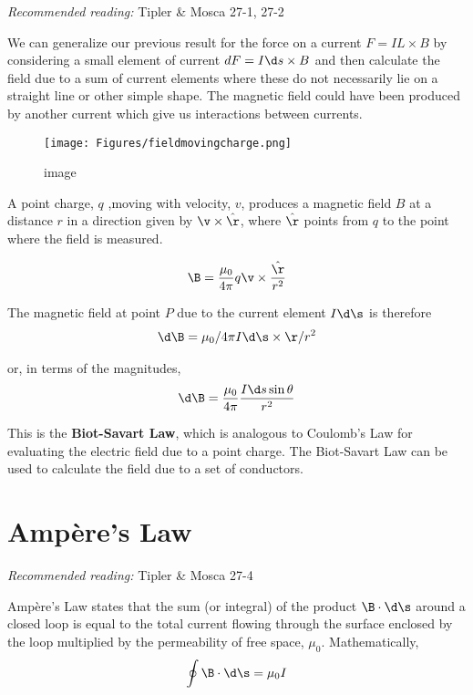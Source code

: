 \documentclass[
]{book}
\theoremstyle{definition}
\theoremstyle{definition}
\theoremstyle{definition}
\theoremstyle{definition}
\theoremstyle{remark}
\begin{document}
\emph{Recommended reading:} Tipler \& Mosca 27-1, 27-2

We can generalize our previous result for the force on a current
\(F = IL \times B\) by considering a small element of current
\(dF = I \d s \times B\) and then calculate the field due to a sum of
current elements where these do not necessarily lie on a straight line
or other simple shape. The magnetic field could have been produced by
another current which give us interactions between currents.

\begin{figure}
\centering
\texttt{[image: Figures/fieldmovingcharge.png]}
\caption{image}
\end{figure}

A point charge, \(q\) ,moving with velocity, \(v\), produces a magnetic
field \(B\) at a distance \(r\) in a direction given by
\(\v \times \hat{\r}\), where \(\hat{\r}\) points from \(q\) to the point
where the field is measured.

\[\begin{aligned}
\B = \frac{\mu_0}{4\pi} q \v \times \frac{\hat{\r}}{r^2} 
\end{aligned}\]

The magnetic field at point \(P\) due to the current element \(I \d\s\) is
therefore \[\begin{aligned}
\d \B = \mu_0/4\pi  I \d\s \times \r /r^2 
\end{aligned}\]

or, in terms of the magnitudes, \[\begin{aligned}
\d \B = \frac{\mu_0}{4\pi}  \frac{I \d s  \sin\theta}{r^2} 
\end{aligned}\]

This is the \textbf{Biot-Savart Law}, which is analogous to Coulomb's Law for
evaluating the electric field due to a point charge. The Biot-Savart Law
can be used to calculate the field due to a set of conductors.  

\hypertarget{ampuxe8res-law}{%
\section{Ampère's Law}\label{ampuxe8res-law}}

\emph{Recommended reading:} Tipler \& Mosca 27-4

Ampère's Law states that the sum (or integral) of the product
\(\B \cdot \d\s\) around a closed loop is equal to the total current
flowing through the surface enclosed by the loop multiplied by the
permeability of free space, \(\mu_0\). Mathematically, \[\begin{aligned}
\oint \B \cdot \d \s = \mu_0 I
\end{aligned}\]
\end{document}
